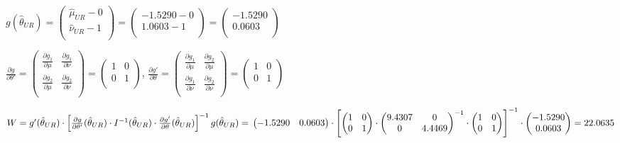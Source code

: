 \begin{problem}
\begin{sol}
$g(\hat{\theta}_{UR}) = \begin{pmatrix}
\hat{\mu}_{UR} - 0 \\
\hat{\nu}_{UR} - 1 \\
\end{pmatrix} = \begin{pmatrix}
-1.5290 - 0\\
1.0603 - 1 \\
\end{pmatrix} = \begin{pmatrix}
-1.5290\\
0.0603 \\
\end{pmatrix}$

$\frac{\partial g}{\partial \theta'} = \begin{pmatrix}
\frac{\partial g_1}{\partial \mu} & \frac{\partial g_1}{\partial \nu} \\
\frac{\partial g_2}{\partial \mu} & \frac{\partial g_2}{\partial \nu} \\
\end{pmatrix} = \begin{pmatrix}
1 & 0\\
0 & 1\\
\end{pmatrix}$, $\frac{\partial g'}{\partial \theta} = \begin{pmatrix}
\frac{\partial g_1}{\partial \mu} & \frac{\partial g_2}{\partial \mu} \\
\frac{\partial g_1}{\partial \nu} & \frac{\partial g_2}{\partial \nu} \\
\end{pmatrix} = \begin{pmatrix}
1 & 0\\
0 & 1\\
\end{pmatrix}$

$W = g'(\hat{\theta}_{UR}) \cdot \left[ \frac{\partial g}{\partial \theta'}(\hat{\theta}_{UR}) \cdot I^{-1}(\hat{\theta}_{UR}) \cdot \frac{\partial g'}{\partial \theta}(\hat{\theta}_{UR}) \right]^{-1} g(\hat{\theta}_{UR}) = \\
\begin{pmatrix}
-1.5290 & 0.0603\\
\end{pmatrix} \cdot \left[ \begin{pmatrix}
1 & 0\\
0 & 1\\
\end{pmatrix} \cdot \begin{pmatrix}
9.4307 & 0 \\
0 & 4.4469 \\
\end{pmatrix}^{-1} \cdot \begin{pmatrix}
1 & 0\\
0 & 1\\
\end{pmatrix} \right]^{-1} \cdot  \begin{pmatrix}
-1.5290\\
0.0603 \\
\end{pmatrix} = 22.0635$


\end{sol}
\end{problem}
